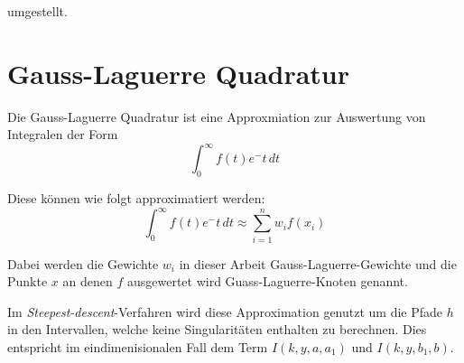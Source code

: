 umgestellt.


\section{Gauss-Laguerre Quadratur}

Die Gauss-Laguerre Quadratur ist eine Approxmiation zur Auswertung von Integralen der Form
\begin{equation}
    \int_{0}^{\infty} f(t) e^-t  \,dt 
\end{equation}

Diese können wie folgt approximatiert werden:
\begin{equation}
    \int_{0}^{\infty} f(t) e^-t  \,dt  \approx \sum_{i = 1}^{n} w_if(x_i) 
\end{equation}

Dabei werden die Gewichte $w_i$ in dieser Arbeit Gauss-Laguerre-Gewichte und die Punkte $x$ an denen $f$ ausgewertet wird Guass-Laguerre-Knoten genannt.

Im \textit{Steepest-descent}-Verfahren wird diese Approximation genutzt um die Pfade $h$ in den Intervallen, welche keine Singularitäten enthalten zu berechnen.
Dies entspricht im eindimenisionalen Fall dem Term $I(k,y,a,a_1)$ und $I(k,y,b_1,b)$.









